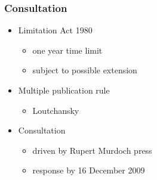 \documentclass[ignorenonframetext,]{beamer}
\begin{document}
\begin{frame}
\frametitle{Consultation}

\begin{itemize}
\item  Limitation Act 1980

  \begin{itemize}
  \item    one year time limit
  \item    subject to possible extension
  \end{itemize}
\item  Multiple publication rule

  \begin{itemize}
  \item    Loutchansky
  \end{itemize}
\item  Consultation

  \begin{itemize}
  \item    driven by Rupert Murdoch press
  \item    response by 16 December 2009
  \end{itemize}
\end{itemize}

~

\end{frame}
\end{document}
